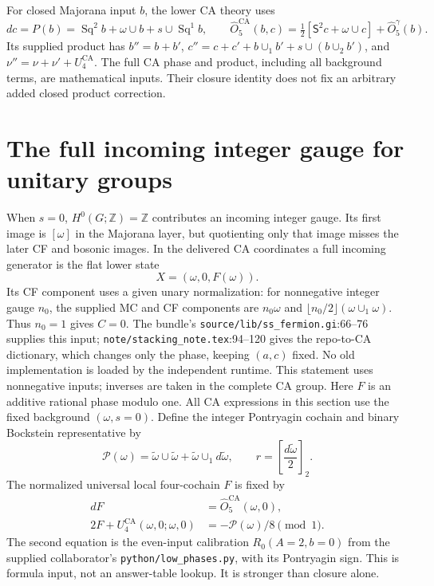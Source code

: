 \documentclass[11pt]{article}
\newcommand{\Z}{\mathbb Z}
\newcommand{\Sq}{\operatorname{Sq}}
\newcommand{\SSq}{\mathsf S}
\newcommand{\lift}[1]{\widetilde{#1}}
\newcommand{\OO}{\widehat O}
\newcommand{\PP}{\mathcal P}
\newcommand{\CA}{\mathrm{CA}}
\newcommand{\pathref}[1]{{\small\nolinkurl{#1}}}
\begin{document}
For closed Majorana input $b$, the lower CA theory uses
\begin{equation}
 d c=P(b)=\Sq^2b+\omega\cup b+s\cup\Sq^1b,
 \qquad\OO_5^{\CA}(b,c)=\tfrac12[\SSq^2c+\omega\cup c]
                          +\OO_5^\gamma(b).
\end{equation}
Its supplied product has $b''=b+b'$,
$c''=c+c'+b\cup_1b'+s\cup(b\cup_2b')$, and
$\nu''=\nu+\nu'+U_4^{\CA}$. The full CA phase and product, including
all background terms, are mathematical inputs. Their closure identity
does not fix an arbitrary added closed product correction.

\newpage
\section{The full incoming integer gauge for unitary groups}
When $s=0$, $H^0(G;\Z)=\Z$ contributes an incoming integer gauge.
Its first image is $[\omega]$ in the Majorana layer, but quotienting
only that image misses the later CF and bosonic images. In the delivered
CA coordinates a full incoming generator is the flat lower state
\begin{equation}
 X=(\omega,0,F(\omega)).
\end{equation}
Its CF component uses a given unary normalization: for nonnegative
integer gauge $n_0$, the supplied MC and CF components are
$n_0\omega$ and $\lfloor n_0/2\rfloor(\omega\cup_1\omega)$.
Thus $n_0=1$ gives $C=0$. The bundle's
\pathref{source/lib/ss_fermion.gi}:66--76 supplies this input;
\pathref{note/stacking_note.tex}:94--120 gives the repo-to-CA dictionary,
which changes only the phase, keeping $(a,c)$ fixed. No old implementation
is loaded by the independent runtime. This statement uses nonnegative
inputs; inverses are taken in the complete CA group.
Here $F$ is an additive rational phase modulo one. All CA expressions
in this section use the fixed background $(\omega,s=0)$. Define the integer
Pontryagin cochain and binary Bockstein representative by
\begin{equation}
 \PP(\omega)=\lift\omega\cup\lift\omega
        +\lift\omega\cup_1d\lift\omega,
 \qquad r=\left[\frac{d\lift\omega}{2}\right]_2.
\end{equation}
The normalized universal local four-cochain $F$ is fixed by
\begin{align}
 dF&=\OO_5^{\CA}(\omega,0),\\
 2F+U_4^{\CA}(\omega,0;\omega,0)&=-\PP(\omega)/8\pmod1.
\end{align}
The second equation is the even-input calibration $R_0(A=2,b=0)$
from the supplied collaborator's \pathref{python/low_phases.py}, with
its Pontryagin sign. This is formula input, not an answer-table lookup.
It is stronger than closure alone.
\end{document}
